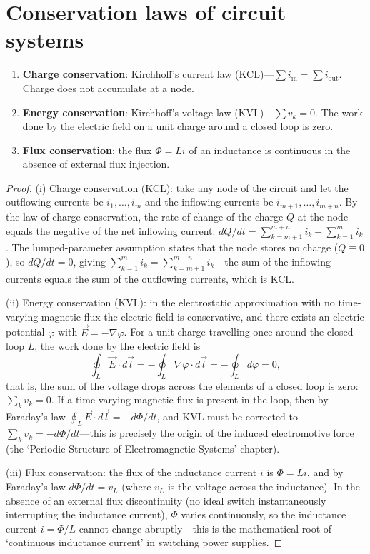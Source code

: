 \section{Conservation laws of circuit systems}

\begin{theorem}\label{thm:circuit_conservation}
\begin{enumerate}[label=(\roman*)]
    \item \textbf{Charge conservation}: Kirchhoff's current law (KCL)---$\sum i_{\text{in}} = \sum i_{\text{out}}$. Charge does not accumulate at a node.
    \item \textbf{Energy conservation}: Kirchhoff's voltage law (KVL)---$\sum v_k = 0$. The work done by the electric field on a unit charge around a closed loop is zero.
    \item \textbf{Flux conservation}: the flux $\Phi = Li$ of an inductance is continuous in the absence of external flux injection.
\end{enumerate}
\end{theorem}

\begin{proof}
(i) Charge conservation (KCL): take any node of the circuit and let the outflowing currents be $i_1,\dots,i_m$ and the inflowing currents be $i_{m+1},\dots,i_{m+n}$. By the law of charge conservation, the rate of change of the charge $Q$ at the node equals the negative of the net inflowing current: $dQ/dt = \sum_{k=m+1}^{m+n}i_k - \sum_{k=1}^{m}i_k$. The lumped-parameter assumption states that the node stores no charge ($Q\equiv 0$), so $dQ/dt=0$, giving $\sum_{k=1}^{m}i_k = \sum_{k=m+1}^{m+n}i_k$---the sum of the inflowing currents equals the sum of the outflowing currents, which is KCL.

(ii) Energy conservation (KVL): in the electrostatic approximation with no time-varying magnetic flux the electric field is conservative, and there exists an electric potential $\varphi$ with $\vec{E} = -\nabla\varphi$. For a unit charge travelling once around the closed loop $L$, the work done by the electric field is
\[
\oint_L \vec{E}\cdot d\vec{l} = -\oint_L \nabla\varphi\cdot d\vec{l} = -\oint_L d\varphi = 0,
\]
that is, the sum of the voltage drops across the elements of a closed loop is zero: $\sum_k v_k = 0$. If a time-varying magnetic flux is present in the loop, then by Faraday's law $\oint_L \vec{E}\cdot d\vec{l} = -d\Phi/dt$, and KVL must be corrected to $\sum_k v_k = -d\Phi/dt$---this is precisely the origin of the induced electromotive force (the `Periodic Structure of Electromagnetic Systems' chapter).

(iii) Flux conservation: the flux of the inductance current $i$ is $\Phi = Li$, and by Faraday's law $d\Phi/dt = v_L$ (where $v_L$ is the voltage across the inductance). In the absence of an external flux discontinuity (no ideal switch instantaneously interrupting the inductance current), $\Phi$ varies continuously, so the inductance current $i = \Phi/L$ cannot change abruptly---this is the mathematical root of `continuous inductance current' in switching power supplies.
\end{proof}

